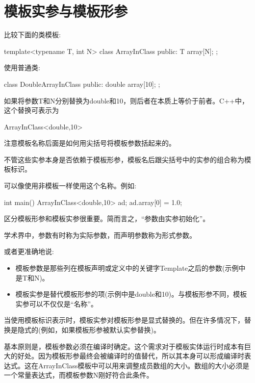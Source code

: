 \section{模板实参与模板形参}

比较下面的类模板:

\begin{cpp}
template<typename T, int N>
class ArrayInClass {
	public:
	T array[N];
};
\end{cpp}

使用普通类:

\begin{cpp}
class DoubleArrayInClass {
	public:
	double array[10];
};
\end{cpp}

如果将参数T和N分别替换为double和10，则后者在本质上等价于前者。C++中，这个替换可表示为

\begin{cpp}
ArrayInClass<double,10>
\end{cpp}

注意模板名称后面是如何用尖括号将模板参数括起来的。

不管这些实参本身是否依赖于模板形参，模板名后跟尖括号中的实参的组合称为模板标识。

可以像使用非模板一样使用这个名称。例如:

\begin{cpp}
int main()
{
	ArrayInClass<double,10> ad;
	ad.array[0] = 1.0;
}
\end{cpp}

区分模板形参和模板实参很重要。简而言之，“参数由实参初始化”。

\begin{notice}
学术界中，参数有时称为实际参数，而声明参数称为形式参数。
\end{notice}

或者更准确地说:

\begin{itemize}
\item 
模板参数是那些列在模板声明或定义中的关键字Template之后的参数(示例中是T和N)。

\item 
模板实参是替代模板形参的项(示例中是double和10)。与模板形参不同，模板实参可以不仅仅是“名称”。
\end{itemize}

当使用模板标识表示时，模板实参对模板形参是显式替换的。但在许多情况下，替换是隐式的(例如，如果模板形参被默认实参替换)。

基本原则是，模板参数必须在编译时确定。这个需求对于模板实体运行时成本有巨大的好处。因为模板形参最终会被编译时的值替代，所以其本身可以形成编译时表达式。这在ArrayInClass模板中可以用来调整成员数组的大小。数组的大小必须是一个常量表达式，而模板参数N刚好符合此条件。

